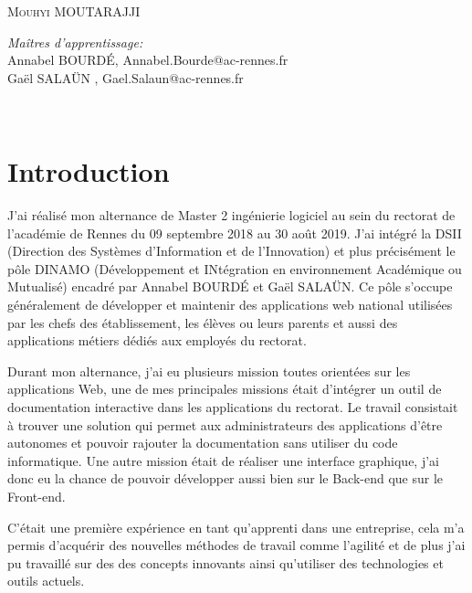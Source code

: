 \documentclass[12pt]{article}
\begin{document}
\begin{titlepage}
	\centering   %
	\textsc{ Mouhyi MOUTARAJJI}\\
		\begin{flushleft} \large
		    \emph{Maîtres d'apprentissage:} \\
		    Annabel BOURDÉ, Annabel.Bourde@ac-rennes.fr\\
			Gaël SALAÜN , Gael.Salaun@ac-rennes.fr\\
			
			
		\end{flushleft}
	
\end{titlepage}


\newpage

\tableofcontents
~
\newpage

\section{Introduction}

J'ai réalisé mon alternance de Master 2 ingénierie logiciel au sein du rectorat de l'académie de Rennes du 09 septembre 2018 au 30 août 2019. J'ai intégré la DSII (Direction des Systèmes d'Information et de l'Innovation) et plus précisément le pôle DINAMO (Développement et INtégration en environnement Académique ou Mutualisé) encadré par Annabel BOURDÉ et Gaël SALAÜN. Ce pôle s'occupe généralement de développer et maintenir des applications web national utilisées par les chefs des établissement, les élèves  ou leurs parents et aussi des applications métiers dédiés aux employés du rectorat.\newline


Durant mon alternance, j'ai eu plusieurs mission toutes orientées sur les  applications Web, une de mes principales missions était d'intégrer un outil de documentation interactive dans les applications du rectorat. Le travail consistait à trouver une solution qui permet aux administrateurs des applications d'être autonomes et pouvoir rajouter la documentation sans utiliser du code informatique. Une autre mission était de réaliser une interface graphique, j'ai donc eu la chance de pouvoir développer aussi bien sur le Back-end que sur le Front-end.\newline   

C'était une première expérience en tant qu'apprenti dans une entreprise, cela m'a permis d'acquérir des nouvelles méthodes de travail comme l'agilité et de plus j'ai pu travaillé sur des des concepts innovants ainsi qu'utiliser des technologies et outils actuels.\newline
\end{document}
